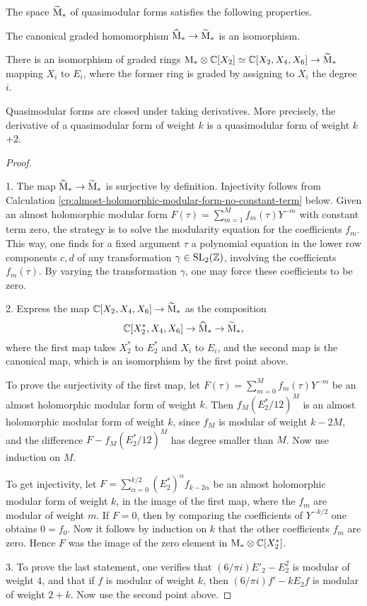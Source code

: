 \begin{prop} \label{pr:derivative} The space $\widetilde{\mathrm{M}}_*$ of quasimodular forms satisfies the following properties.

   The canonical graded homomorphism $\widehat{\mathrm{M}}_* \to \widetilde{\mathrm{M}}_*$ is an isomorphism.
  
   There is an isomorphism of graded rings $\mathrm{M}_* \otimes \mathbb{C}[X_2] \simeq \mathbb{C}[X_2, X_4, X_6]\to \widetilde{\mathrm{M}}_*$ mapping $X_i$ to $E_i$, where the former ring is graded by assigning to $X_i$ the degree $i$.
  
   Quasimodular forms are closed under taking derivatives. More precisely, the derivative of a quasimodular form of weight $k$ is a quasimodular form of weight $k$+2.
\end{prop}
\begin{proof}\ 

  1. The map $\widehat{\mathrm{M}}_* \to \widetilde{\mathrm{M}}_*$ is surjective by definition. Injectivity follows from Calculation \ref{cp:almost-holomorphic-modular-form-no-constant-term} below. Given an almost holomorphic modular form $F(\tau)=\sum_{m=1}^Mf_m(\tau)Y^{-m}$ with constant term zero, the strategy is to solve the modularity equation for the coefficients $f_m$. This way, one finds for a fixed argument $\tau$ a polynomial equation in the lower row components  $c,d$ of any transformation $\gamma \in \operatorname{SL}_2(\mathbb{Z})$, involving the coefficients $f_m(\tau)$. By varying the transformation $\gamma$, one may force these coefficients to be zero.
  
  2. Express the map $\mathbb{C}[X_2, X_4, X_6]\to \widetilde{\mathrm{M}}_*$ as the composition \[\mathbb{C}[X^*_2, X_4, X_6]\to \widehat{\mathrm{M}}_* \to \widetilde{\mathrm{M}}_*,\] where the first map takes $X^*_2$ to $E_2^*$ and $X_i$ to $E_i$, and the second map is the canonical map, which is an isomorphism by the first point above.
  
  To prove the surjectivity of the first map, let $F(\tau)=\sum_{m=0}^Mf_m(\tau)Y^{-m}$ be an almost holomorphic modular form of weight $k$. Then $f_M (E_2^*/12)^M$ is an almost holomorphic modular form of weight $k$, since $f_M$ is modular of weight $k-2M$, and the difference $F - f_M (E_2^*/12)^M$ has degree smaller than $M$. Now use induction on $M$.
  
  To get injectivity, let $F=\sum_{\alpha=0}^{k/2}(E_2^*)^\alpha f_{k-2\alpha}$ be an almost holomorphic modular form of weight $k$, in the image of the first map, where the $f_m$ are modular of weight $m$. If $F=0$, then by comparing the coefficients of $Y^{-k/2}$ one obtains $0=f_0$. Now it follows by induction on $k$ that the other coefficients $f_m$ are zero. Hence $F$ was the image of the zero element in $\mathrm{M}_* \otimes \mathbb{C}[X^*_2]$.
  
  3. To prove the last statement, one verifies that $(6/\pi i) E'_2-E_2^2$ is modular of weight $4$, and that if $f$ is modular of weight $k$, then $(6/\pi i)f' - kE_2f$ is modular of weight $2+k$. Now use the second point above.
\end{proof}

